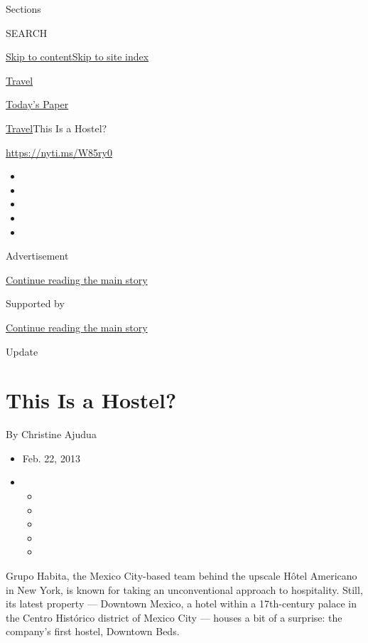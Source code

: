 Sections

SEARCH

\protect\hyperlink{site-content}{Skip to
content}\protect\hyperlink{site-index}{Skip to site index}

\href{https://www.nytimes3xbfgragh.onion/section/travel}{Travel}

\href{https://myaccount.nytimes3xbfgragh.onion/auth/login?response_type=cookie\&client_id=vi}{}

\href{https://www.nytimes3xbfgragh.onion/section/todayspaper}{Today's
Paper}

\href{/section/travel}{Travel}\textbar{}This Is a Hostel?

\url{https://nyti.ms/W85ry0}

\begin{itemize}
\item
\item
\item
\item
\item
\end{itemize}

Advertisement

\protect\hyperlink{after-top}{Continue reading the main story}

Supported by

\protect\hyperlink{after-sponsor}{Continue reading the main story}

Update

\hypertarget{this-is-a-hostel}{%
\section{This Is a Hostel?}\label{this-is-a-hostel}}

By Christine Ajudua

\begin{itemize}
\item
  Feb. 22, 2013
\item
  \begin{itemize}
  \item
  \item
  \item
  \item
  \item
  \end{itemize}
\end{itemize}

Grupo Habita, the Mexico City-based team behind the upscale Hôtel
Americano in New York, is known for taking an unconventional approach to
hospitality. Still, its latest property --- Downtown Mexico, a hotel
within a 17th-century palace in the Centro Histórico district of Mexico
City --- houses a bit of a surprise: the company's first hostel,
Downtown Beds.

